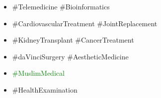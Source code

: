 \documentclass[25pt,a1paper]{tikzposter}
\begin{document}
{\begin{itemize}
As a renowned university hospital with a worldwide patients, TMWH is fully committed to offering the best service available.


\item \#Telemedicine \#Bioinformatics
\item \#CardiovascularTreatment \#JointReplacement
\item \#KidneyTransplant \#CancerTreatment
\item \#daVinciSurgery \#AestheticMedicine
\item \textcolor{green}{\#MuslimMedical}
\item \#HealthExamination
\end{itemize}
}

\end{document}
